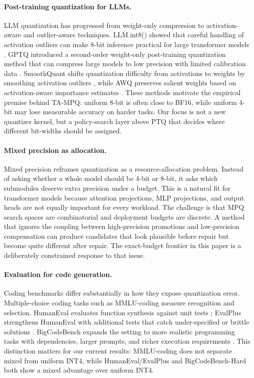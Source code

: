 \documentclass{article}
\newcommand{\method}{TA-MPQ}
\begin{document}
\paragraph{Post-training quantization for LLMs.}
LLM quantization has progressed from weight-only compression to activation-aware and outlier-aware techniques. LLM.int8() showed that careful handling of activation outliers can make 8-bit inference practical for large transformer models \cite{dettmers2022llm}. GPTQ introduced a second-order weight-only post-training quantization method that can compress large models to low precision with limited calibration data \cite{frantar2023gptq}. SmoothQuant shifts quantization difficulty from activations to weights by smoothing activation outliers \cite{xiao2023smoothquant}, while AWQ preserves salient weights based on activation-aware importance estimates \cite{lin2024awq}. These methods motivate the empirical premise behind \method{}: uniform 8-bit is often close to BF16, while uniform 4-bit may lose measurable accuracy on harder tasks. Our focus is not a new quantizer kernel, but a policy-search layer above PTQ that decides where different bit-widths should be assigned.

\paragraph{Mixed precision as allocation.}
Mixed precision reframes quantization as a resource-allocation problem. Instead of asking whether a whole model should be 4-bit or 8-bit, it asks which submodules deserve extra precision under a budget. This is a natural fit for transformer models because attention projections, MLP projections, and output heads are not equally important for every workload. The challenge is that MPQ search spaces are combinatorial and deployment budgets are discrete. A method that ignores the coupling between high-precision promotions and low-precision compensation can produce candidates that look plausible before repair but become quite different after repair. The exact-budget frontier in this paper is a deliberately constrained response to that issue.

\paragraph{Evaluation for code generation.}
Coding benchmarks differ substantially in how they expose quantization error. Multiple-choice coding tasks such as MMLU-coding measure recognition and selection. HumanEval evaluates function synthesis against unit tests \cite{chen2021humaneval}; EvalPlus strengthens HumanEval with additional tests that catch under-specified or brittle solutions \cite{liu2023evalplus}. BigCodeBench expands the setting to more realistic programming tasks with dependencies, larger prompts, and richer execution requirements \cite{zhuo2024bigcodebench}. This distinction matters for our current results: MMLU-coding does not separate mixed from uniform INT4, while HumanEval/EvalPlus and BigCodeBench-Hard both show a mixed advantage over uniform INT4.
\end{document}
